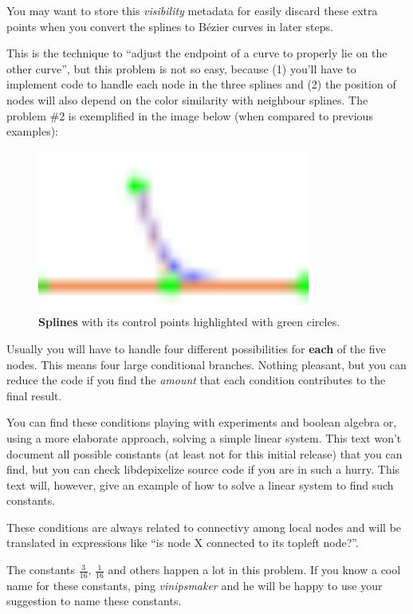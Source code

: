 You may want to store this \emph{visibility} metadata for easily discard these
extra points when you convert the splines to Bézier curves in later steps.

This is the technique to ``adjust the endpoint of a curve to properly
lie on the other curve'', but this problem is not so easy, because (1) you'll
have to implement code to handle each node in the three splines and (2) the
position of nodes will also depend on the color similarity with neighbour
splines. The problem \#2 is exemplified in the image below (when compared to
previous examples):

\begin{figure}[H]
  \centering
  \includegraphics[width=0.8\textwidth]{assets/subdivision4.pdf}
  \caption{\textbf{Splines} with its control points highlighted with green
    circles.}
\end{figure}

Usually you will have to handle four different possibilities for \textbf{each}
of the five nodes. This means four large conditional branches. Nothing pleasant,
but you can reduce the code if you find the \emph{amount} that each condition
contributes to the final result.

You can find these conditions playing with experiments and boolean algebra or,
using a more elaborate approach, solving a simple linear system. This text won't
document all possible constants (at least not for this initial release) that you
can find, but you can check libdepixelize source code if you are in such a
hurry. This text will, however, give an example of how to solve a linear system
to find such constants.

These conditions are always related to connectivy among local nodes and will be
translated in expressions like ``is node X connected to its topleft node?''.

The constants $\frac{3}{16}$, $\frac{1}{16}$ and others happen a lot in this
problem. If you know a cool name for these constants, ping \emph{vinipsmaker}
and he will be happy to use your suggestion to name these constants.

